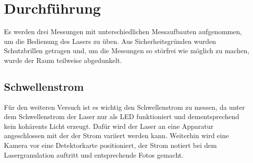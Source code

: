 \section{Durchführung}
\label{sec:Durchführung}
Es werden drei Messungen mit unterschiedlichen Messaufbauten aufgenommen, um die Bedienung des Lasers zu üben.
Aus Sicherheitsgründen wurden Schutzbrillen getragen und, um die Messungen so störfrei wie möglich zu machen,
wurde der Raum teilweise abgedunkelt.

\subsection{Schwellenstrom}
\label{sec:Schwellenstrom}
Für den weiteren Versuch ist es wichtig den Schwellenstrom zu messen, da unter dem Schwellenstrom der Laser nur
als LED funktioniert und dementsprechend kein kohärents Licht erzeugt. Dafür wird der Laser an eine Apparatur
angeschlossen mit der der Strom variiert werden kann. Weiterhin wird eine Kamera vor eine Detektorkarte
positioniert, der Strom notiert bei dem Lasergranulation auftritt und entsprechende Fotos gemacht.